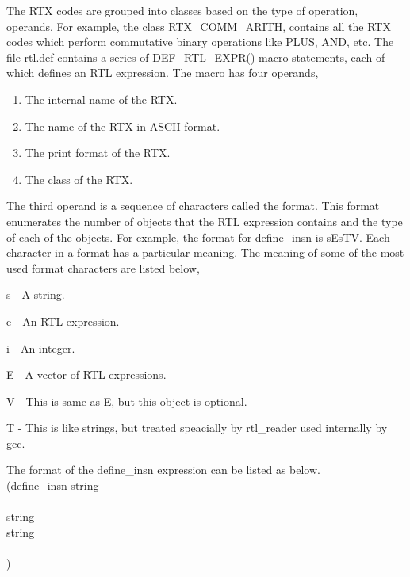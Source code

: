 The RTX codes are grouped into classes based on the type of operation, operands. For example, the class RTX\_COMM\_ARITH, contains 
all the RTX codes which perform commutative binary operations like PLUS, AND, etc. The file rtl.def contains a series of
DEF\_RTL\_EXPR() macro statements, each of which defines an RTL expression. The macro has four operands, 

\begin{enumerate}
 \item The internal name of the RTX.
 \item The name of the RTX in ASCII format.
 \item The print format of the RTX.
 \item The class of the RTX.
\end{enumerate}



The third operand is a sequence of characters called the format. This format enumerates the number of objects that the RTL 
expression contains and the type of each of the objects. For example, the format for define\_insn is sEsTV. Each character in a 
format has a particular meaning. The meaning of some of the most used format characters are listed below,
\begin{description}
 \item s - A string.
 \item e - An RTL expression.
 \item i - An integer.
 \item E - A vector of RTL expressions.
 \item V - This is same as E, but this object is optional.
 \item T - This is like strings, but treated speacially by rtl\_reader used internally by gcc.
\end{description}

The format of the define\_insn expression can be listed as below.\\ 
(define\_insn string\\
\\
\indent       string\\
\indent       string\\
\\
)\\ 



